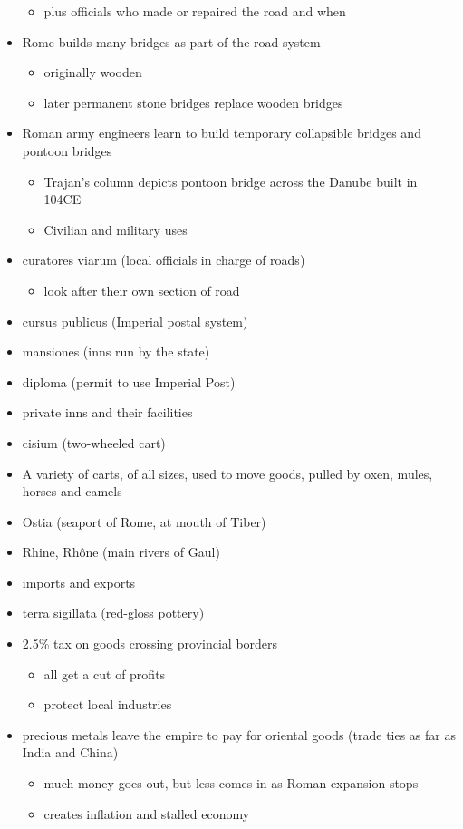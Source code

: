 \documentclass[12pt, twoside]{article}
\begin{document}
\begin{itemize}
\begin{itemize}
	\item plus officials who made or repaired the road and when
	\end{itemize}
\item Rome builds many bridges as part of the road system
	\begin{itemize}
	\item originally wooden
	\item later permanent stone bridges replace wooden bridges
	\end{itemize}
\item Roman army engineers learn to build temporary collapsible bridges and pontoon bridges
	\begin{itemize}
	\item  Trajan’s column depicts pontoon bridge across the Danube built in 104CE
	\item  Civilian and military uses
	\end{itemize}
\item curatores viarum (local officials in charge of roads)
	\begin{itemize}
	\item look after their own section of road
	\end{itemize}
\item cursus publicus (Imperial postal system)
\item mansiones (inns run by the state)
\item diploma (permit to use Imperial Post)
\item private inns and their facilities
\item cisium (two-wheeled cart)
\item A variety of carts, of all sizes, used to move goods, pulled by oxen, mules, horses and camels
\item Ostia (seaport of Rome, at mouth of Tiber)
\item Rhine, Rhône (main rivers of Gaul)
\item imports and exports
\item terra sigillata (red-gloss pottery)
\item 2.5\% tax on goods crossing provincial borders
	\begin{itemize}
	\item all get a cut of profits
	\item protect local industries
	\end{itemize}
\item precious metals leave the empire to pay for oriental goods (trade ties as far as India and China)
	\begin{itemize}
	\item much money goes out, but less comes in as Roman expansion stops
	\item creates inflation and stalled economy
	\end{itemize}
\end{itemize}	
\end{document}
